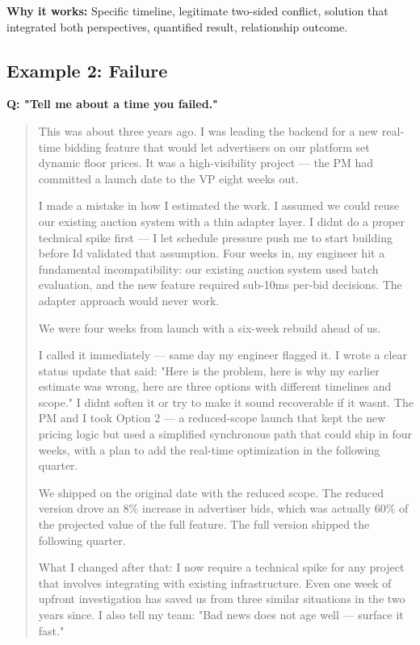 \documentclass[11pt]{article}
\begin{document}
\textbf{Why it works:} Specific timeline, legitimate two-sided conflict, solution that integrated both perspectives, quantified result, relationship outcome.

\subsection{Example 2: Failure}\label{example-2-failure}

\textbf{Q: "Tell me about a time you failed."}

\begin{quote}
This was about three years ago. I was leading the backend for a new real-time bidding feature that would let advertisers on our platform set dynamic floor prices. It was a high-visibility project --- the PM had committed a launch date to the VP eight weeks out.

I made a mistake in how I estimated the work. I assumed we could reuse our existing auction system with a thin adapter layer. I didn\textquotesingle t do a proper technical spike first --- I let schedule pressure push me to start building before I\textquotesingle d validated that assumption. Four weeks in, my engineer hit a fundamental incompatibility: our existing auction system used batch evaluation, and the new feature required sub-10ms per-bid decisions. The adapter approach would never work.

We were four weeks from launch with a six-week rebuild ahead of us.

I called it immediately --- same day my engineer flagged it. I wrote a clear status update that said: "Here is the problem, here is why my earlier estimate was wrong, here are three options with different timelines and scope." I didn\textquotesingle t soften it or try to make it sound recoverable if it wasn\textquotesingle t. The PM and I took Option 2 --- a reduced-scope launch that kept the new pricing logic but used a simplified synchronous path that could ship in four weeks, with a plan to add the real-time optimization in the following quarter.

We shipped on the original date with the reduced scope. The reduced version drove an 8\% increase in advertiser bids, which was actually 60\% of the projected value of the full feature. The full version shipped the following quarter.

What I changed after that: I now require a technical spike for any project that involves integrating with existing infrastructure. Even one week of upfront investigation has saved us from three similar situations in the two years since. I also tell my team: "Bad news does not age well --- surface it fast."
\end{quote}
\end{document}
